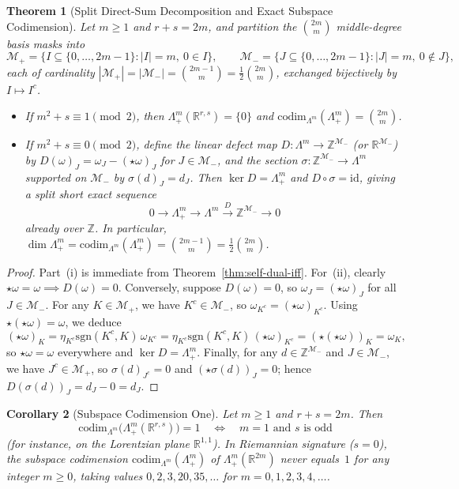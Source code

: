 \documentclass[11pt]{article}
\newtheorem{theorem}{Theorem}[section]
\newtheorem{corollary}[theorem]{Corollary}
\theoremstyle{definition}
\newcommand{\R}{\mathbb{R}}
\newcommand{\Z}{\mathbb{Z}}
\newcommand{\sgn}{\mathrm{sgn}}
\newcommand{\codim}{\mathrm{codim}}
\newcommand{\id}{\mathrm{id}}
\begin{document}
\begin{theorem}[Split Direct-Sum Decomposition and Exact Subspace Codimension]\label{thm:subspace-codim}
Let $m \ge 1$ and $r + s = 2m$, and partition the $\binom{2m}{m}$ middle-degree basis masks into
\[
  \mathcal{M}_+ = \bigl\{I \subseteq \{0,\dots,2m-1\} : |I|=m,\ 0 \in I\bigr\}, \qquad
  \mathcal{M}_- = \bigl\{J \subseteq \{0,\dots,2m-1\} : |J|=m,\ 0 \notin J\bigr\},
\]
each of cardinality $|\mathcal{M}_+| = |\mathcal{M}_-| = \binom{2m-1}{m} = \frac{1}{2}\binom{2m}{m}$, exchanged bijectively by $I \mapsto I^c$.
\begin{itemize}
  \item[(i)] If $m^2 + s \equiv 1 \pmod 2$, then $\Lambda^m_+(\R^{r,s}) = \{0\}$ and $\codim_{\Lambda^m}(\Lambda^m_+) = \binom{2m}{m}$.
  \item[(ii)] If $m^2 + s \equiv 0 \pmod 2$, define the linear defect map $D : \Lambda^m \to \Z^{\mathcal{M}_-}$ (or $\R^{\mathcal{M}_-}$) by $D(\omega)_J = \omega_J - (\star\omega)_J$ for $J \in \mathcal{M}_-$, and the section $\sigma : \Z^{\mathcal{M}_-} \to \Lambda^m$ supported on $\mathcal{M}_-$ by $\sigma(d)_J = d_J$. Then $\ker D = \Lambda^m_+$ and $D \circ \sigma = \id$, giving a split short exact sequence
  \[
    0 \longrightarrow \Lambda^m_+ \longrightarrow \Lambda^m \xrightarrow{\;D\;} \Z^{\mathcal{M}_-} \longrightarrow 0
  \]
  already over $\Z$. In particular, $\dim\Lambda^m_+ = \codim_{\Lambda^m}(\Lambda^m_+) = \binom{2m-1}{m} = \frac{1}{2}\binom{2m}{m}$.
\end{itemize}
\end{theorem}

\begin{proof}
Part~(i) is immediate from Theorem~\ref{thm:self-dual-iff}. For~(ii), clearly $\star\omega = \omega \implies D(\omega) = 0$. Conversely, suppose $D(\omega) = 0$, so $\omega_J = (\star\omega)_J$ for all $J \in \mathcal{M}_-$. For any $K \in \mathcal{M}_+$, we have $K^c \in \mathcal{M}_-$, so $\omega_{K^c} = (\star\omega)_{K^c}$. Using $\star(\star\omega) = \omega$, we deduce
\[
  (\star\omega)_K = \eta_{K^c}\sgn(K^c, K)\,\omega_{K^c} = \eta_{K^c}\sgn(K^c, K)\,(\star\omega)_{K^c} = (\star(\star\omega))_K = \omega_K,
\]
so $\star\omega = \omega$ everywhere and $\ker D = \Lambda^m_+$. Finally, for any $d \in \Z^{\mathcal{M}_-}$ and $J \in \mathcal{M}_-$, we have $J^c \in \mathcal{M}_+$, so $\sigma(d)_{J^c} = 0$ and $(\star\sigma(d))_J = 0$; hence $D(\sigma(d))_J = d_J - 0 = d_J$.
\end{proof}

\begin{corollary}[Subspace Codimension One]\label{cor:codim-one}
Let $m \ge 1$ and $r + s = 2m$. Then
\[
  \codim_{\Lambda^m}\bigl(\Lambda^m_+(\R^{r,s})\bigr) = 1
  \quad\Longleftrightarrow\quad
  m = 1 \text{ and } s \text{ is odd}
\]
(for instance, on the Lorentzian plane $\R^{1,1}$). In Riemannian signature ($s = 0$), the subspace codimension $\codim_{\Lambda^m}(\Lambda^m_+)$ of $\Lambda^m_+(\R^{2m})$ never equals~$1$ for \emph{any} integer $m \ge 0$, taking values $0, 2, 3, 20, 35, \dots$ for $m = 0, 1, 2, 3, 4, \dots$.
\end{corollary}
\end{document}
